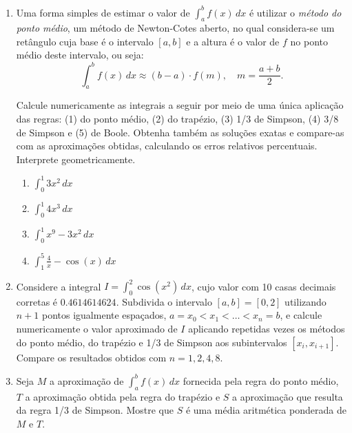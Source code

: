 \documentclass[12pt,a4paper]{article}
\begin{document}
\begin{enumerate}
\item Uma forma simples de estimar o valor de $\int_a^b f(x)\,dx$ é utilizar o \textit{método do ponto médio}, um método de Newton-Cotes aberto, no qual considera-se um retângulo cuja base é o intervalo $[a,b]$ e a altura é o valor de $f$ no ponto médio deste intervalo, ou seja:
\[
\int_a^b f(x)\,dx \approx (b-a) \cdot f\left(m \right),
\quad
m = \frac{a+b}{2}.
\]

Calcule numericamente as integrais a seguir por meio de uma única aplicação das regras: (1) do ponto médio, (2) do trapézio, (3) 1/3 de Simpson, (4) 3/8 de Simpson e (5) de Boole. Obtenha também as soluções exatas e compare-as com as aproximações obtidas, calculando os erros relativos percentuais. Interprete geometricamente.
\begin{multicols}{4}
\begin{enumerate}
\item $\int_0^1 3x^2 \,dx$
\item $\int_0^1 4x^3 \,dx$
\item $\int_{0}^1 x^9 - 3x^2 \,dx$
\item $\int_{1}^5 \frac{4}{x} - \cos(x) \,dx$
\end{enumerate}
\end{multicols}

\item Considere a integral $I = \int_0^2 \cos(x^2)\, dx$, cujo valor com 10 casas decimais corretas é $0.4614614624$. Subdivida o intervalo $[a, b] = [0, 2]$ utilizando $n+1$ pontos igualmente espaçados, $a = x_0 < x_1 < \ldots < x_n = b$, e calcule numericamente o valor aproximado de $I$ aplicando repetidas vezes os métodos do ponto médio, do trapézio e 1/3 de Simpson aos subintervalos $[x_i,x_{i+1}]$. Compare os resultados obtidos com $n = 1, 2, 4, 8$.

\item Seja $M$ a aproximação de $\int_a^b f(x)\, dx$ fornecida pela regra do ponto médio, $T$ a aproximação obtida pela regra do trapézio e $S$ a aproximação que resulta da regra 1/3 de Simpson. Mostre que $S$ é uma média aritmética ponderada de $M$ e $T$.


\end{enumerate}
\end{document}
